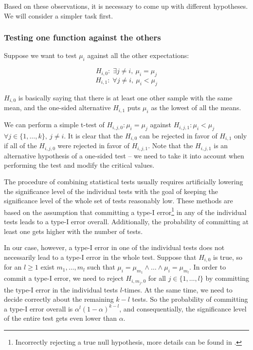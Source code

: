 Based on these observations, it is necessary to come up with different hypotheses. We will consider a simpler task first.

\subsubsection{Testing one function against the others}

Suppose we want to test $\mu_i$ against all the other expectations:

\[
H_{i,0}: \; \exists j \neq i, \ \mu_i = \mu_j
\]
\[
H_{i,1}: \; \forall j \neq i, \ \mu_i < \mu_j
\]

$H_{i,0}$ is basically saying that there is at least one other sample with the same mean, and the one-sided alternative $H_{i,1}$ puts $\mu_i$ as the lowest of all the means.

We can perform a simple t-test of $H_{i,j,0}: \mu_i = \mu_j$ against $H_{i,j,1}: \mu_i < \mu_j$ $\forall j \in \{1, \dots, k\}, \ j \neq i$. It is clear that the $H_{i,0}$ can be rejected in favor of $H_{i,1}$ only if all of the $H_{i,j,0}$ were rejected in favor of $H_{i,j,1}$. Note that the $H_{i,j,1}$ is an alternative hypothesis of a one-sided test -- we need to take it into account when performing the test and modify the critical values.

The procedure of combining statistical tests usually requires artificially lowering the significance level of the individual tests with the goal of keeping the significance level of the whole set of tests reasonably low. These methods are based on the assumption that committing a type-I error\footnote{Incorrectly rejecting a true null hypothesis, more details can be found in \cite{weiss_introductory_2010}.} in any of the individual tests leads to a type-I error overall. Additionally, the probability of committing at least one gets higher with the number of tests.

In our case, however, a type-I error in one of the individual tests does not necessarily lead to a type-I error in the whole test. Suppose that $H_{i,0}$ is true, so for an $l \geq 1$ exist $m_1,\dots,m_l$ such that $\mu_i = \mu_{m_1} \wedge \dots \wedge \mu_i = \mu_{m_l}$. In order to commit a type-I error, we need to reject $H_{i,m_j,0}$ for all $j \in \{1, \dots, l\}$ by committing the type-I error in the individual tests $l$-times. At the same time, we need to decide correctly about the remaining $k-l$ tests. So the probability of committing a type-I error overall is $\alpha^l(1-\alpha)^{k-l}$, and consequentially, the significance level of the entire test gets even lower than $\alpha$.

